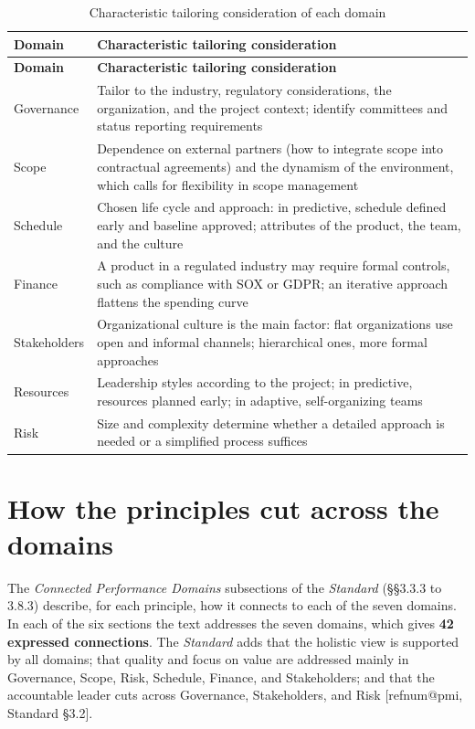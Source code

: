 \documentclass[11pt,a4paper]{article}
\makeatletter
\newcommand{\refnum}[1]{\csname refnum@#1\endcsname}
\newcommand{\cit}[1]{[\refnum{#1}]}
\newcommand{\SingleSpacing}{}
\newcommand{\fontetab}[1]{\par\vspace{3pt}{\small\noindent Source: #1\par}}
\makeatother
\begin{document}
\begingroup\SingleSpacing\small
\begin{longtable}{@{}>{\raggedright\arraybackslash}p{}>{\raggedright\arraybackslash}p{}@{}}
\caption{Characteristic tailoring consideration of each domain}\label{tab:t9}\\
\toprule
\textbf{Domain} & \textbf{Characteristic tailoring consideration}\\
\midrule
\endfirsthead
\toprule
\textbf{Domain} & \textbf{Characteristic tailoring consideration}\\
\midrule
\endhead
\bottomrule
\endfoot
\bottomrule
\endlastfoot
Governance & Tailor to the industry, regulatory considerations, the organization, and the project context; identify committees and status reporting requirements\\[3pt]
Scope & Dependence on external partners (how to integrate scope into contractual agreements) and the dynamism of the environment, which calls for flexibility in scope management\\[3pt]
Schedule & Chosen life cycle and approach: in predictive, schedule defined early and baseline approved; attributes of the product, the team, and the culture\\[3pt]
Finance & A product in a regulated industry may require formal controls, such as compliance with SOX or GDPR; an iterative approach flattens the spending curve\\[3pt]
Stakeholders & Organizational culture is the main factor: flat organizations use open and informal channels; hierarchical ones, more formal approaches\\[3pt]
Resources & Leadership styles according to the project; in predictive, resources planned early; in adaptive, self-organizing teams\\[3pt]
Risk & Size and complexity determine whether a detailed approach is needed or a simplified process suffices\\[3pt]
\end{longtable}
\endgroup
\fontetab{Prepared by the authors (2026), based on \cit{pmi}.}

\section{How the principles cut across the domains}

The \textit{Connected Performance Domains} subsections of the \textit{Standard} (§§3.3.3 to 3.8.3) describe, for each principle, how it connects to each of the seven domains. In each of the six sections the text addresses the seven domains, which gives \textbf{42 expressed connections}. The \textit{Standard} adds that the holistic view is supported by all domains; that quality and focus on value are addressed mainly in Governance, Scope, Risk, Schedule, Finance, and Stakeholders; and that the accountable leader cuts across Governance, Stakeholders, and Risk [\refnum{pmi}, Standard §3.2].
\end{document}
